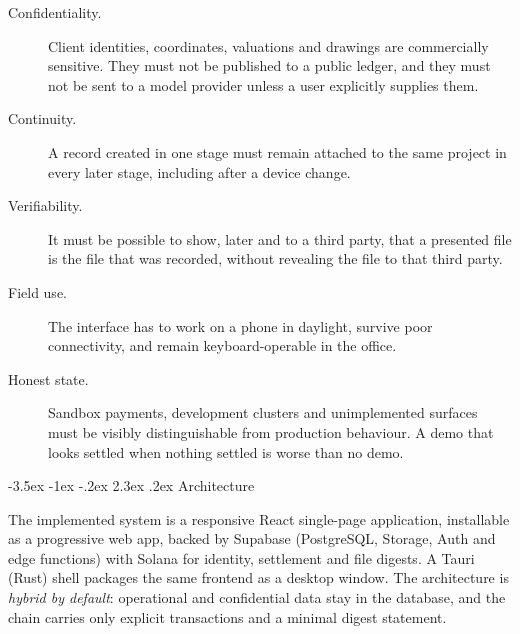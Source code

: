 \documentclass[10pt,a4paper,twocolumn]{article}
\makeatletter
\renewcommand\section{\@startsection{section}{1}{\z@}
  {-3.5ex \@plus -1ex \@minus -.2ex}
  {2.3ex \@plus.2ex}
  {\normalfont\Large\bfseries\hyphenpenalty=10000\exhyphenpenalty=10000}}
\makeatother
\begin{document}
\begin{description}
  \item[Confidentiality.] Client identities, coordinates, valuations and drawings are
        commercially sensitive. They must not be published to a public ledger, and
        they must not be sent to a model provider unless a user explicitly supplies
        them.
  \item[Continuity.] A record created in one stage must remain attached to the same
        project in every later stage, including after a device change.
  \item[Verifiability.] It must be possible to show, later and to a third party, that
        a presented file is the file that was recorded, without revealing the file
        to that third party.
  \item[Field use.] The interface has to work on a phone in daylight, survive poor
        connectivity, and remain keyboard-operable in the office.
  \item[Honest state.] Sandbox payments, development clusters and unimplemented
        surfaces must be visibly distinguishable from production behaviour. A demo
        that looks settled when nothing settled is worse than no demo.
\end{description}

\section{Architecture}
\label{sec:arch}

The implemented system is a responsive React single-page application, installable as
a progressive web app, backed by Supabase \cite{supabase} (PostgreSQL, Storage, Auth
and edge functions) with Solana \cite{yakovenko2017} for identity, settlement and file
digests. A Tauri \cite{tauri} (Rust) shell packages the same frontend as a desktop
window. The architecture is
\emph{hybrid by default}: operational and confidential data stay in the database,
and the chain carries only explicit transactions and a minimal digest statement.
\end{document}
